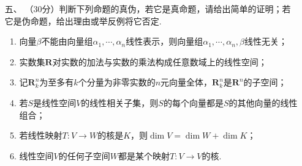 \begin{enumerate}
\begin{enumerate}[label=(\arabic*)]
    \end{enumerate}
	\item[五、]（30分）判断下列命题的真伪，若它是真命题，请给出简单的证明；若它是伪命题，给出理由或举反例将它否定.
    \begin{enumerate}[label=(\arabic*)]
        \item 向量$\beta$不能由向量组$\alpha_1,\cdots,\alpha_n$线性表示，则向量组$\alpha_1,\cdots,\alpha_n,\beta$线性无关；
        \item 实数集$\mathbf{R}$对实数的加法与实数的乘法构成任意数域上的线性空间；
        \item 记$\mathbf{R}_k^n$为至多有$k$个分量为非零实数的$n$元向量全体，$\mathbf{R}_k^n$是$\mathbf{R}^n$的子空间；
        \item 若$S$是线性空间$V$的线性相关子集，则$S$的每个向量都是$S$的其他向量的线性组合；
        \item 若线性映射$T:V\to W$的核是$K$，则$\dim V=\dim W+\dim K$；
        \item 线性空间$V$的任何子空间$W$都是某个映射$T:V\to V$的核.
    \end{enumerate}
\end{enumerate}

\clearpage
